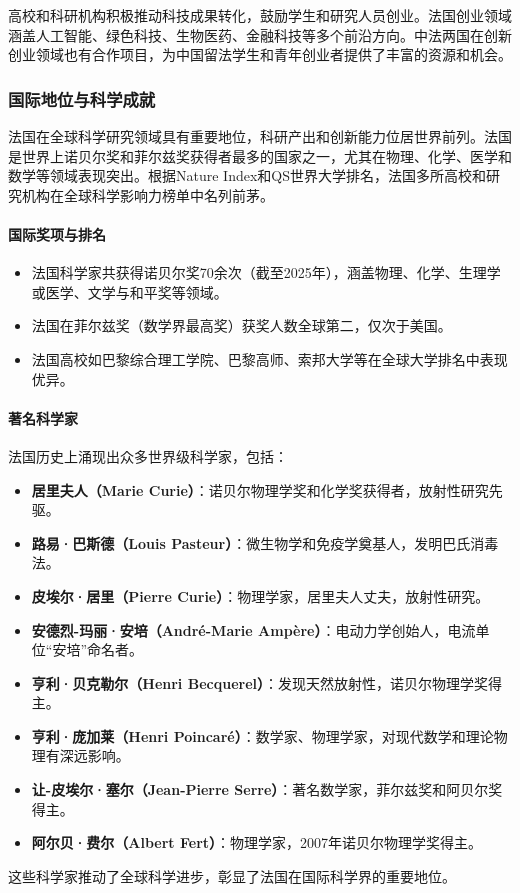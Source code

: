 高校和科研机构积极推动科技成果转化，鼓励学生和研究人员创业。法国创业领域涵盖人工智能、绿色科技、生物医药、金融科技等多个前沿方向。中法两国在创新创业领域也有合作项目，为中国留法学生和青年创业者提供了丰富的资源和机会。

\subsubsection{国际地位与科学成就}

法国在全球科学研究领域具有重要地位，科研产出和创新能力位居世界前列。法国是世界上诺贝尔奖和菲尔兹奖获得者最多的国家之一，尤其在物理、化学、医学和数学等领域表现突出。根据Nature Index和QS世界大学排名，法国多所高校和研究机构在全球科学影响力榜单中名列前茅。

\paragraph{国际奖项与排名}
\begin{itemize}
  \item 法国科学家共获得诺贝尔奖70余次（截至2025年），涵盖物理、化学、生理学或医学、文学与和平奖等领域。
  \item 法国在菲尔兹奖（数学界最高奖）获奖人数全球第二，仅次于美国。
  \item 法国高校如巴黎综合理工学院、巴黎高师、索邦大学等在全球大学排名中表现优异。
\end{itemize}

\paragraph{著名科学家}
法国历史上涌现出众多世界级科学家，包括：
\begin{itemize}
  \item \textbf{居里夫人（Marie Curie）}：诺贝尔物理学奖和化学奖获得者，放射性研究先驱。
  \item \textbf{路易·巴斯德（Louis Pasteur）}：微生物学和免疫学奠基人，发明巴氏消毒法。
  \item \textbf{皮埃尔·居里（Pierre Curie）}：物理学家，居里夫人丈夫，放射性研究。
  \item \textbf{安德烈-玛丽·安培（André-Marie Ampère）}：电动力学创始人，电流单位“安培”命名者。
  \item \textbf{亨利·贝克勒尔（Henri Becquerel）}：发现天然放射性，诺贝尔物理学奖得主。
  \item \textbf{亨利·庞加莱（Henri Poincaré）}：数学家、物理学家，对现代数学和理论物理有深远影响。
  \item \textbf{让-皮埃尔·塞尔（Jean-Pierre Serre）}：著名数学家，菲尔兹奖和阿贝尔奖得主。
  \item \textbf{阿尔贝·费尔（Albert Fert）}：物理学家，2007年诺贝尔物理学奖得主。
\end{itemize}
这些科学家推动了全球科学进步，彰显了法国在国际科学界的重要地位。

